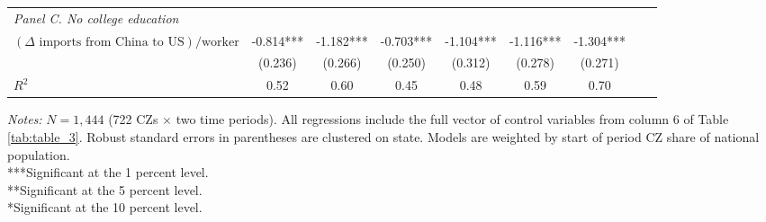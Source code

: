 \begin{frame}
\begin{table}[ht]
{\begin{tabular}{lcccccccc}
                \midrule
                \multicolumn{9}{l}{\textit{Panel C. No college education}} \\
$(\Delta \text{ imports from China to US})/\text{worker}$ 
                & -0.814*** & -1.182*** & -0.703*** & -1.104*** & -1.116*** & -1.304*** \\
                & (0.236)   & (0.266)   & (0.250)   & (0.312)   & (0.278)   & (0.271)   \\
$R^2$          
                & 0.52      & 0.60      & 0.45      & 0.48      & 0.59      & 0.70      \\
                \bottomrule
            \end{tabular}
        }
        \vspace{0.2cm}
        
        \begin{minipage}{\linewidth}
            \tiny
            \textit{Notes:} $N = 1,444$ (722 CZs $\times$ two time periods). All regressions include the full vector of control variables from column 6 of Table \ref{tab:table_3}. Robust standard errors in parentheses are clustered on state. Models are weighted by start of period CZ share of national population. \\
            ***Significant at the 1 percent level. \\
            **Significant at the 5 percent level. \\
            *Significant at the 10 percent level.
        \end{minipage}
        \label{tab:table_6}
    \end{table}
\end{frame}


